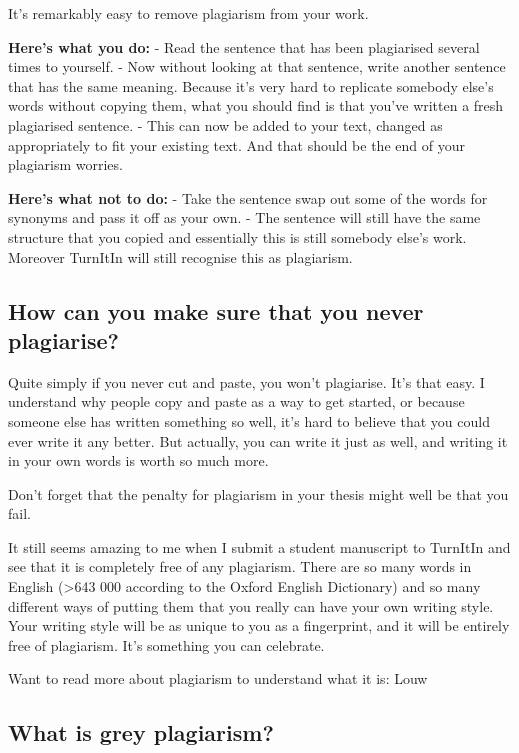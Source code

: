 \documentclass[
]{krantz}
\begin{document}
It's remarkably easy to remove plagiarism from your work.

\textbf{Here's what you do:}
- Read the sentence that has been plagiarised several times to yourself.
- Now without looking at that sentence, write another sentence that has the same meaning. Because it's very hard to replicate somebody else's words without copying them, what you should find is that you've written a fresh plagiarised sentence.
- This can now be added to your text, changed as appropriately to fit your existing text. And that should be the end of your plagiarism worries.

\textbf{Here's what not to do:}
- Take the sentence swap out some of the words for synonyms and pass it off as your own.
- The sentence will still have the same structure that you copied and essentially this is still somebody else's work. Moreover TurnItIn will still recognise this as plagiarism.

\hypertarget{how-can-you-make-sure-that-you-never-plagiarise}{%
\subsection{How can you make sure that you never plagiarise?}\label{how-can-you-make-sure-that-you-never-plagiarise}}

Quite simply if you never cut and paste, you won't plagiarise. It's that easy. I understand why people copy and paste as a way to get started, or because someone else has written something so well, it's hard to believe that you could ever write it any better. But actually, you can write it just as well, and writing it in your own words is worth so much more.

Don't forget that the penalty for plagiarism in your thesis might well be that you fail.

It still seems amazing to me when I submit a student manuscript to TurnItIn and see that it is completely free of any plagiarism. There are so many words in English (\textgreater643 000 according to the Oxford English Dictionary) and so many different ways of putting them that you really can have your own writing style. Your writing style will be as unique to you as a fingerprint, and it will be entirely free of plagiarism. It's something you can celebrate.

Want to read more about plagiarism to understand what it is: Louw \citeyearpar{louw2017defining}

\hypertarget{what-is-grey-plagiarism}{%
\subsection{What is grey plagiarism?}\label{what-is-grey-plagiarism}}
\end{document}
